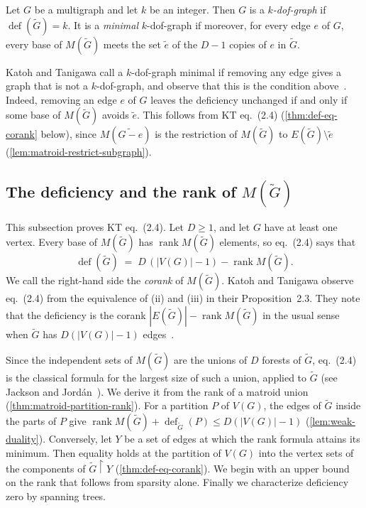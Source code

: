 \begin{definition}
  \label{def:k-dof}
  \leanok
  Let $G$ be a multigraph and let $k$ be an integer. Then $G$ is a
  \emph{$k$-dof-graph} if $\operatorname{def}(\tilde G) = k$. It is a
  \emph{minimal} $k$-dof-graph if moreover, for every edge $e$ of $G$,
  every base of $M(\tilde G)$ meets the set $\tilde e$ of the $D - 1$
  copies of $e$ in $\tilde G$.
\end{definition}

Katoh and Tanigawa call a $k$-dof-graph minimal if removing any edge
gives a graph that is not a $k$-dof-graph, and observe that this is the
condition above~\cite[pp.~656--657]{katohTanigawa2011}. Indeed,
removing an edge $e$ of $G$ leaves the deficiency unchanged if and only
if some base of $M(\tilde G)$ avoids $\tilde e$. This follows from KT
eq.~(2.4) (\cref{thm:def-eq-corank} below), since
$M(\widetilde{G - e})$ is the restriction of $M(\tilde G)$ to
$E(\tilde G) \setminus \tilde e$ (\cref{lem:matroid-restrict-subgraph}).

\subsection{The deficiency and the rank of \texorpdfstring{$M(\tilde G)$}{M(G~)}}
\label{sec:molecular-deficiency-bridge}

This subsection proves KT eq.~(2.4). Let $D \ge 1$, and let $G$ have at
least one vertex. Every base of $M(\tilde G)$ has
$\operatorname{rank} M(\tilde G)$ elements, so eq.~(2.4) says that
\[
  \operatorname{def}(\tilde G) \;=\;
  D\,(|V(G)| - 1) - \operatorname{rank} M(\tilde G).
\]
We call the right-hand side the \emph{corank} of $M(\tilde G)$. Katoh
and Tanigawa observe eq.~(2.4) from the equivalence of (ii) and (iii)
in their Proposition~2.3. They note that the deficiency is the corank
$|E(\tilde G)| - \operatorname{rank} M(\tilde G)$ in the usual sense
when $\tilde G$ has $D(|V(G)| - 1)$
edges~\cite[pp.~655--656]{katohTanigawa2011}.

Since the independent sets of $M(\tilde G)$ are the unions of $D$
forests of $\tilde G$, eq.~(2.4) is the classical formula for the
largest size of such a union, applied to $\tilde G$ (see Jackson and
Jord\'an~\cite[Theorem~4.1(a)]{jacksonJordan2009}). We derive it from
the rank of a matroid union (\cref{thm:matroid-partition-rank}). For a
partition $P$ of $V(G)$, the edges of $\tilde G$ inside the parts of
$P$ give
$\operatorname{rank} M(\tilde G) + \operatorname{def}_{\tilde G}(P)
\le D(|V(G)| - 1)$ (\cref{lem:weak-duality}). Conversely, let $Y$ be a
set of edges at which the rank formula attains its minimum. Then
equality holds at the partition of $V(G)$ into the vertex sets of the
components of $\tilde G \restriction Y$ (\cref{thm:def-eq-corank}). We
begin with an upper bound on the rank that follows from sparsity alone.
Finally we characterize deficiency zero by spanning trees.

